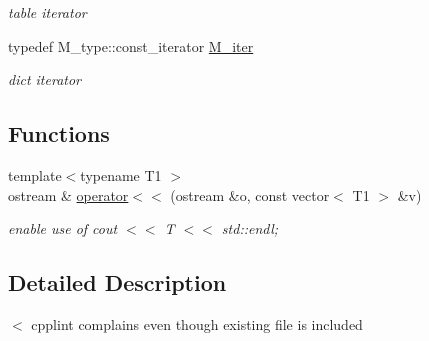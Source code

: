 \begin{DoxyCompactItemize}
\begin{DoxyCompactList}\small\item\em table iterator \end{DoxyCompactList}\item 
\hypertarget{namespacejlettvin_adb899a2c00ed7361dbc22a0bc907f88c}{}typedef M\+\_\+type\+::const\+\_\+iterator \hyperlink{namespacejlettvin_adb899a2c00ed7361dbc22a0bc907f88c}{M\+\_\+iter}\label{namespacejlettvin_adb899a2c00ed7361dbc22a0bc907f88c}

\begin{DoxyCompactList}\small\item\em dict iterator \end{DoxyCompactList}\end{DoxyCompactItemize}
\subsection*{Functions}
\begin{DoxyCompactItemize}
\item 
\hypertarget{namespacejlettvin_a240221b0ca26041fcbd1bd192beda4bb}{}{\footnotesize template$<$typename T1 $>$ }\\ostream \& \hyperlink{namespacejlettvin_a240221b0ca26041fcbd1bd192beda4bb}{operator$<$$<$} (ostream \&o, const vector$<$ T1 $>$ \&v)\label{namespacejlettvin_a240221b0ca26041fcbd1bd192beda4bb}

\begin{DoxyCompactList}\small\item\em enable use of cout $<$$<$ T $<$$<$ std\+::endl; \end{DoxyCompactList}\end{DoxyCompactItemize}


\subsection{Detailed Description}
$<$ cpplint complains even though existing file is included 